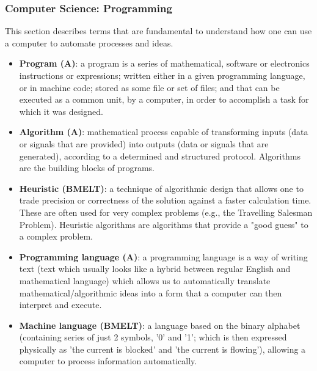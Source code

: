 \documentclass{article}
\begin{document}
\subsubsection*{Computer Science: Programming}

This section describes terms that are fundamental to understand how one can use a computer to automate processes and ideas.

\begin{itemize}

	\item \textbf{Program (A)}: a program is a series of mathematical, software or electronics instructions or expressions; written either in a given programming language, or in machine code; stored as some file or set of files; and that can be executed as a common unit, by a computer, in order to accomplish a task for which it was designed.

	\item \textbf{Algorithm (A)}: mathematical process capable of transforming inputs (data or signals that are provided) into outputs (data or signals that are generated), according to a determined and structured protocol. Algorithms are the building blocks of programs.

	\item \textbf{Heuristic (BMELT)}: a technique of algorithmic design that allows one to trade precision or correctness of the solution against a faster calculation time. These are often used for very complex problems (e.g., the Travelling Salesman Problem). Heuristic algorithms are algorithms that provide a "good guess" to a complex problem.

	\item \textbf{Programming language (A)}: a programming language is a way of writing text (text which usually looks like a hybrid between regular English and mathematical language) which allows us to automatically translate mathematical/algorithmic ideas into a form that a computer can then interpret and execute.

	\item \textbf{Machine language (BMELT)}: a language based on the binary alphabet (containing series of just 2 symbols, '0' and '1'; which is then expressed physically as 'the current is blocked' and 'the current is flowing'), allowing a computer to process information automatically.


\end{itemize}
\end{document}
